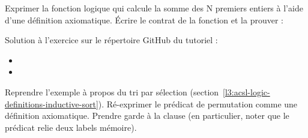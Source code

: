 





Exprimer la fonction logique qui calcule la somme des N premiers entiers à l'aide
d'une définition axiomatique. Écrire le contrat de la fonction 
et la prouver :



\begin{Information}
  Solution à l'exercice sur le répertoire GitHub du tutoriel :
  \begin{itemize}
    \item {}
    \item {}
  \end{itemize}
\end{Information}




Reprendre l'exemple à propos du tri par sélection
(section~\ref{l3:acsl-logic-definitions-inductive-sort}). Ré-exprimer le
prédicat de permutation comme une définition axiomatique. Prendre garde à la
clause  (en particulier, noter que le prédicat relie deux
labels mémoire).




